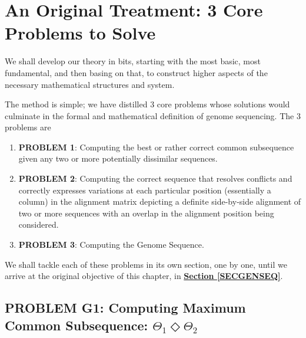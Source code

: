 \documentclass[a4paper, 18pt]{article} %
\begin{document}
\section{An Original Treatment: 3 Core Problems to Solve}
\label{SEC3COREPROB}

We shall develop our theory in bits, starting with the most basic, most fundamental, and then basing on that, to construct higher aspects of the necessary mathematical structures and system.

The method is simple; we have distilled 3 core problems whose solutions would culminate in the formal and mathematical definition of genome sequencing. The 3 problems are


\begin{enumerate}
\item \textbf{PROBLEM 1}: Computing the best or rather correct common subsequence given any two or more potentially dissimilar sequences.
\item \textbf{PROBLEM 2}: Computing the correct sequence that resolves conflicts and correctly expresses variations at each particular position (essentially a column) in the alignment matrix depicting a definite side-by-side alignment of two or more sequences with an overlap in the alignment position being considered.
\item \textbf{PROBLEM 3}: Computing the Genome Sequence.
\end{enumerate}

We shall tackle each of these problems in its own section, one by one, until we arrive at the original objective of this chapter, in \textbf{\hyperref[SECGENSEQ]{Section \ref{SECGENSEQ}}}.

\subsection{PROBLEM G1: Computing Maximum Common Subsequence: $\Theta_1 \Diamond \Theta_2$}
\label{PROBG1}
\end{document}
